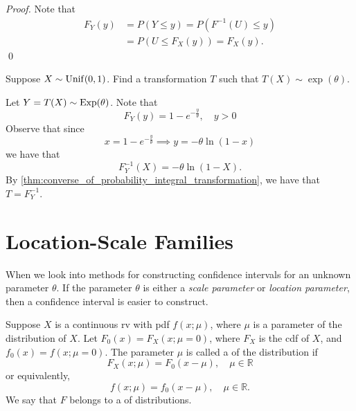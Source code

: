 \documentclass[notoc,notitlepage]{tufte-book}
\begin{document}
\begin{proof}
  Note that
  \begin{align*}
    F_Y(y) &= P(Y \leq y) = P( F^{-1}(U) \leq y ) \\
           &= P(U \leq F_X(y)) = F_X(y).
  \end{align*}\qed
\end{proof}

\begin{eg}[Example 2.12]
  Suppose $X \sim \operatorname{Unif}(0, 1)$. Find a transformation $T$ such that $T(X) \sim \exp(\theta)$.

  \begin{solution}
    Let $Y = T(X) \sim \operatorname{Exp}(\theta)$. Note that
    \begin{equation*}
      F_Y(y) = 1 - e^{-\frac{y}{\theta}}, \quad y > 0
    \end{equation*}
    Observe that since
    \begin{equation*}
      x = 1 - e^{-\frac{y}{\theta}} \implies y = - \theta \ln (1 - x)
    \end{equation*}
    we have that
    \begin{equation*}
      F_Y^{-1}(X) = - \theta \ln (1 - X).
    \end{equation*}
    By \autoref{thm:converse_of_probability_integral_transformation}, we have that $T = F_Y^{-1}$.
  \end{solution}
\end{eg}


\section{Location-Scale Families}%
\label{sec:location_scale_families}

When we look into methods for constructing confidence intervals for an unknown parameter $\theta$. If the parameter $\theta$ is either a \textit{scale parameter} or \textit{location parameter}, then a confidence interval is easier to construct.

\begin{defn}
\label{defn:location_parameter_and_family}
  Suppose $X$ is a continuous rv with pdf $f(x; \mu)$, where $\mu$ is a parameter of the distribution of $X$. Let $F_0(x) = F_X(x; \mu = 0)$, where $F_X$ is the cdf of $X$, and $f_0(x) = f(x; \mu = 0)$. The parameter $\mu$ is called a  of the distribution if
  \begin{equation*}
    F_X(x; \mu) = F_0( x - \mu ), \quad \mu \in \mathbb{R}
  \end{equation*}
  or equivalently,
  \begin{equation*}
    f(x; \mu) = f_0( x - \mu ), \quad \mu \in \mathbb{R}.
  \end{equation*}
  We say that $F$ belongs to a  of distributions.
\end{defn}
\end{document}

